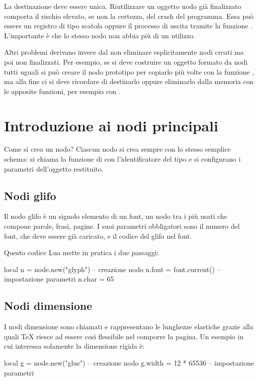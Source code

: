 La destinazione deve essere unica. Riutilizzare un oggetto nodo già finalizzato
comporta il rischio elevato, se non la certezza, del crash del programma. Essa
può essere un registro di tipo scatola oppure il processo di uscita tramite la
funzione . L'importante è che lo stesso nodo
non abbia più di un utilizzo.

Altri problemi derivano invece dal non eliminare esplicitamente nodi creati ma
poi non finalizzati. Per esempio, se si deve costruire un oggetto formato da
nodi tutti uguali si può creare il nodo prototipo per copiarlo più volte con la
funzione , ma alla fine ci si deve ricordare di
destinarlo oppure eliminarlo dalla memoria con le apposite funzioni, per esempio
con .


\section{Introduzione ai nodi principali}

Come si crea un nodo? Ciascun nodo si crea sempre con lo stesso semplice schema:
si chiama la funzione  di  con
l'identificatore del tipo e si configurano i parametri dell'oggetto restituito.


\subsection{Nodi glifo}

Il nodo glifo è un signolo elemento di un font, un nodo tra i più usati che
compone parole, frasi, pagine. I suoi parametri obbligatori sono il numero del
font, che deve essere già caricato, e il codice del glifo nel font.

Questo codice Lua mette in pratica i due passaggi:
\begin{lines}
local n = node.new("glyph") -- creazione nodo
n.font = font.current()     -- impostazione parametri
n.char = 65
\end{lines}


\subsection{Nodi dimensione}

I nodi dimensione sono chiamati  e rappresentano le lunghezze
elastiche grazie alla quali \TeX{} riesce ad essere così flessibile nel comporre
la pagina. Un esempio in cui interessa solamente la dimensione rigida è:
\begin{lines}
local g = node.new("glue") -- creazione nodo
g.width = 12 * 65536       -- impostazione parametri
\end{lines}

